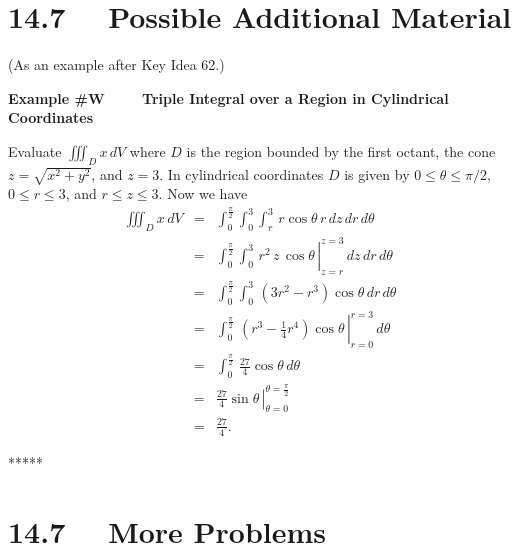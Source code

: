 \section*{14.7 \ \  Possible Additional Material}

(As an example after Key Idea 62.)

\textbf{Example \#W \ \ \ \ Triple Integral over a Region in Cylindrical Coordinates}


Evaluate $\iiint_D x\,dV$ where $D$ is the region bounded by the first octant, the cone $z = \sqrt{x^2 + y^2}$, and $z = 3$.  In cylindrical coordinates $D$ is given by $0 \leq \theta \leq \pi/2$, $0 \leq r \leq 3$, and $r \leq z \leq 3$.  Now we have
\begin{eqnarray*}
\iiint_D x\,dV & = & \int_0^{\frac{\pi}{2}} \int_0^3 \int_r^3 \, r\cos \theta\,r\,dz\,dr\,d\theta \\
 & = & \left. \int_0^{\frac{\pi}{2}} \int_0^3 \, r^2\,z\,\cos \theta\, \right|_{z = r}^{z = 3}\,dz\,dr\,d\theta \\
  & = & \int_0^{\frac{\pi}{2}} \int_0^3 \, (3r^2 - r^3) \cos \theta \,dr\,d\theta \\
  & = & \left. \int_0^{\frac{\pi}{2}} \, (r^3 - \frac{1}{4} r^4) \cos \theta \,\right|_{r=0}^{r=3} \,d\theta \\
  & = & \int_0^{\frac{\pi}{2}} \, \frac{27}{4} \cos \theta \,d\theta \\
  & = & \left.\frac{27}{4} \sin \theta \,\right|_{\theta=0}^{\theta=\frac{\pi}{2}} \\  
  & = & \frac{27}{4}.
\end{eqnarray*}

*****



\section*{14.7 \ \ More Problems}

\ 


